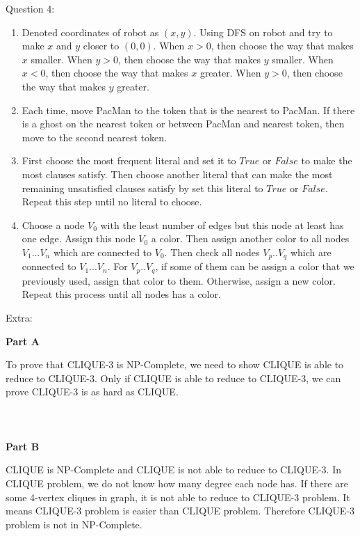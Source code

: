 \documentclass[12pt]{article}
\begin{document}
\pagebreak
\noindent
\large Question 4: \vspace{5mm} \par
\normalsize
\begin{enumerate}
  \item Denoted coordinates of robot as $(x, y)$. Using DFS on robot and try to make $x$ and $y$ closer to $(0, 0)$. 
	When $x > 0$, then choose the way that makes $x$ smaller. When $y > 0$, then choose the way that makes $y$ smaller. 
	When $x < 0$, then choose the way that makes $x$ greater. When $y > 0$, then choose the way that makes $y$ greater. 
  \item Each time, move PacMan to the token that is the nearest to PacMan. 
	If there is a ghost on the nearest token or between PacMan and nearest token, then move to the second nearest token. 
  \item First choose the most frequent literal and set it to $True$ or $False$ to make the most clauses satisfy. 
	Then choose another literal that can make the most remaining unsatisfied clauses satisfy by set this literal to $True$ or $False$.
	Repeat this step until no literal to choose. 
  \item Choose a node $V_0$ with the least number of edges but this node at least has one edge. Assign this node $V_0$ a color. 
	Then assign another color to all nodes $V_1 ... V_n$ which are connected to $V_0$. 
	Then check all nodes $V_p .. V_q$ which are connected to $V_1 ... V_n$. 
	For $V_p .. V_q$, if some of them can be assign a color that we previously used, assign that color to them. Otherwise, assign a new color.
	Repeat this process until all nodes has a color.  
\end{enumerate}


\pagebreak
\noindent
\large Extra: \vspace{5mm} \par
\normalsize 
\textbf{Part A} \par
To prove that CLIQUE-3 is NP-Complete, we need to show CLIQUE is able to reduce to CLIQUE-3. 
Only if CLIQUE is able to reduce  to CLIQUE-3, we can prove CLIQUE-3 is as hard as CLIQUE. 
\\
\\
\\
\\
\noindent
\textbf{Part B} \par
CLIQUE is NP-Complete and CLIQUE is not able to reduce to CLIQUE-3. 
In CLIQUE problem, we do not know how many degree each node has. 
If there are some 4-vertex cliques in graph, it is not able to reduce to CLIQUE-3 problem.
It means CLIQUE-3 problem is easier than CLIQUE problem. 
Therefore CLIQUE-3 problem is not in NP-Complete.
\end{document}
